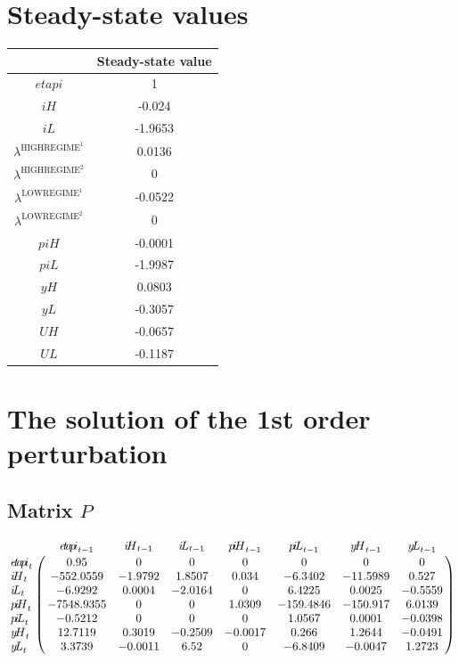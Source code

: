 

\section{Steady-state values}


\begin{tabular}{c|c|}
  & Steady-state value\\
\hline
${e\!t\!a\!p\!i}$ & 1 \\
${i\!H}$ & -0.024 \\
${i\!L}$ & -1.9653 \\
$\lambda^{\mathrm{HIGHREGIME}^{\mathrm{1}}}$ & 0.0136 \\
$\lambda^{\mathrm{HIGHREGIME}^{\mathrm{2}}}$ & 0 \\
$\lambda^{\mathrm{LOWREGIME}^{\mathrm{1}}}$ & -0.0522 \\
$\lambda^{\mathrm{LOWREGIME}^{\mathrm{2}}}$ & 0 \\
${p\!i\!H}$ & -0.0001 \\
${p\!i\!L}$ & -1.9987 \\
${y\!H}$ & 0.0803 \\
${y\!L}$ & -0.3057 \\
${U\!H}$ & -0.0657 \\
${U\!L}$ & -0.1187 \\
\hline
\end{tabular}


\section{The solution of the 1st order perturbation}

\subsection*{Matrix $P$}

$$\bordermatrix{
~ & {e\!t\!a\!p\!i}_{t-1} & {i\!H}_{t-1} & {i\!L}_{t-1} & {p\!i\!H}_{t-1} & {p\!i\!L}_{t-1} & {y\!H}_{t-1} & {y\!L}_{t-1} \cr
{e\!t\!a\!p\!i}_{t} & 0.95 & 0 & 0 & 0 & 0 & 0 & 0 \cr
{i\!H}_{t} & -552.0559 & -1.9792 & 1.8507 & 0.034 & -6.3402 & -11.5989 & 0.527 \cr
{i\!L}_{t} & -6.9292 & 0.0004 & -2.0164 & 0 & 6.4225 & 0.0025 & -0.5559 \cr
{p\!i\!H}_{t} & -7548.9355 & 0 & 0 & 1.0309 & -159.4846 & -150.917 & 6.0139 \cr
{p\!i\!L}_{t} & -0.5212 & 0 & 0 & 0 & 1.0567 & 0.0001 & -0.0398 \cr
{y\!H}_{t} & 12.7119 & 0.3019 & -0.2509 & -0.0017 & 0.266 & 1.2644 & -0.0491 \cr
{y\!L}_{t} & 3.3739 & -0.0011 & 6.52 & 0 & -6.8409 & -0.0047 & 1.2723 \cr
}$$

